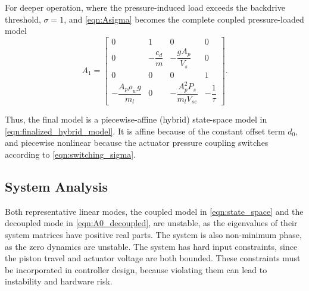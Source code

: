 ﻿\documentclass[subscriptcorrection,upint,varvw,barcolor=Goldenrod3,mathalfa=cal=euler,balance,hyphenate,french,pdf-a]{asmejour}
\begin{document}
For deeper operation, where the pressure-induced load exceeds the backdrive threshold, \(\sigma=1\), and \eqref{eqn:Asigma} becomes the complete coupled pressure-loaded model
\[
    A_{1}=\begin{bmatrix}
        0 & 1 & 0 & 0 \\
        0 & -\dfrac{c_d}{m} & -\dfrac{gA_p}{V_s} & 0 \\
        0 & 0 & 0 & 1 \\
        -\dfrac{A_p\rho_wg}{m_l} & 0 & -\dfrac{A_p^2P_s}{m_lV_{se}} & -\dfrac{1}{\tau}
    \end{bmatrix}.
\]

Thus, the final model is a piecewise-affine (hybrid) state-space model in \eqref{eqn:finalized_hybrid_model}. It is affine because of the constant offset term $d_0$, and piecewise nonlinear because the actuator pressure coupling switches according to \eqref{eqn:switching_sigma}.

\subsection{System Analysis}
Both representative linear modes, the coupled model in \eqref{eqn:state_space} and the decoupled mode in \eqref{eqn:A0_decoupled}, are unstable, as the eigenvalues of their system matrices have positive real parts. The system is also non-minimum phase, as the zero dynamics are unstable. The system has hard input constraints, since the piston travel and actuator voltage are both bounded. These constraints must be incorporated in controller design, because violating them can lead to instability and hardware risk.
\end{document}
